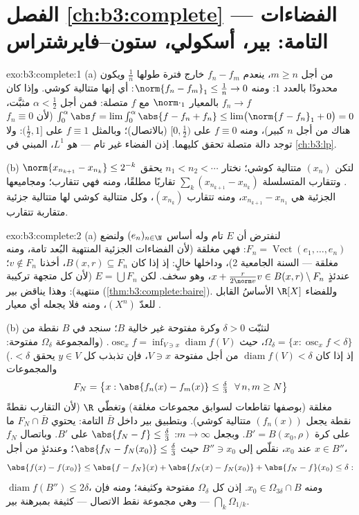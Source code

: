 \section*{الفصل \ref{ch:b3:complete} --- الفضاءات التامة:
بير، أسكولي، ستون--فايرشتراس}

\begin{solution}{exo:b3:complete:1}
(a) من أجل $m \geq n$، ينعدم $f_n - f_m$ خارج فترة طولها
$\frac1n$ ويكون محدودًا بالعدد $1$: ومنه $\norm{f_n - f_m}_1
\leq \frac1n \to 0$: أي إنها متتالية
كوشي. وإذا كان $f_n \to f$ بالمعيار $\norm\cdot_1$ مع $f$ متصلة:
فمن أجل $\alpha <
\frac12$ مثبَّت، $\int_0^{\alpha}\abs f = \lim \int_0^\alpha\abs{f -
f_n + f_n} \leq \lim\bigl(\norm{f - f_n}_1 + 0\bigr) = 0$ (لأن $f_n \equiv 0$ هناك من أجل $n$
كبير)، ومنه $f \equiv 0$ على $[0, \frac12)$ (بالاتصال)؛ وبالمثل
$f \equiv 1$ على $(\frac12, 1]$: ولا توجد دالة متصلة تحقق
كليهما. إذن الفضاء غير تام ---  هو $L^1$، المبني في
\cref{ch:b3:lp}.

(b) لتكن $(x_n)$ متتالية كوشي؛ نختار $n_1 < n_2 < \cdots$ يحقق $\norm{x_{n_{k+1}} - x_{n_k}} \leq 2^{-k}$. وتتقارب
المتسلسلة $\sum_k (x_{n_{k+1}} - x_{n_k})$ تقاربًا مطلقًا، ومنه فهي تتقارب؛ ومجاميعها
الجزئية هي $x_{n_{k+1}} - x_{n_1}$، ومنه تتقارب $(x_{n_k})$، وكل متتالية كوشي
لها متتالية جزئية متقاربة تتقارب.
\end{solution}

\begin{solution}{exo:b3:complete:2}
(a) لنفترض أن $E$ تام وله أساس  $(e_n)_{n\in\N}$ ولنضع
$F_n = \operatorname{Vect}(e_1, \dots, e_n)$: فهي مغلقة (لأن الفضاءات الجزئية المنتهية البُعد تامة،
ومنه مغلقة --- السنة الجامعية 2)، وداخلها خالٍ: إذ إذا كان
$B(x, r) \subseteq F_n$، أخذنا $v \notin F_n$؛ عندئذٍ $x + \frac{r}{2\norm v}v \in B(x,r)
\setminus F_n$، وهو سخف. لكن
$E = \bigcup F_n$ (لأن كل متجهة تركيبة منتهية): وهذا يناقض بير
(\cref{thm:b3:complete:baire}). وللفضاء $\R[X]$ الأساسُ القابل للعدّ $(X^n)$، ومنه فلا
يجعله أي معيار .

(b) لنثبّت $\delta > 0$ وكرة مفتوحة غير خالية $B$؛ سنجد في $B$
نقطة من $\Omega_\delta = \{x : \operatorname{osc}_xf <
\delta\}$، حيث $\operatorname{osc}_xf = \inf_{V \ni
x}\operatorname{diam} f(V)$. (والمجموعة $\Omega_\delta$ مفتوحة:
إذ إذا كان $\operatorname{diam}f(V) < \delta$ من أجل مفتوحة $V \ni x$، فإن تذبذب كل
$y \in V$ يحقق $< \delta$.) والمجموعات
\[
F_N = \bigl\{x : \abs{f_n(x) - f_m(x)} \leq \tfrac\delta3\
\ \forall\, n, m \geq N \bigr\}
\]
مغلقة (بوصفها تقاطعات لسوابق مجموعات مغلقة) وتغطّي $\R$ (لأن
التقارب نقطةً نقطة يجعل $(f_n(x))$ متتالية كوشي). وبتطبيق بير
داخل $\bar B$ التامة: يحتوي $F_N \cap
\bar B$ ما على كرة $B' = B(x_0, \rho)$. وبجعل
$m \to
\infty$: $\abs{f_N - f} \leq \frac\delta3$ على $B'$. وباتصال $f_N$ عند $x_0$، نقلّص إلى
$B'' \ni x_0$ حيث $\abs{f_N - f_N(x_0)} \leq \frac\delta3$؛ وعندئذٍ من أجل $x \in B''$،
\[
\abs{f(x) - f(x_0)} \leq \abs{f - f_N}(x) + \abs{f_N(x) -
f_N(x_0)} + \abs{f_N - f}(x_0) \leq \delta:
\]
$\operatorname{diam} f(B'') \leq 2\delta$، ومنه $x_0 \in
\Omega_{3\delta} \cap B$. إذن كل $\Omega_\delta$ مفتوحة وكثيفة؛
ومنه فإن $\bigcap_k\Omega_{1/k}$ --- وهي مجموعة نقط الاتصال --- كثيفة بمبرهنة
بير.
\end{solution}

